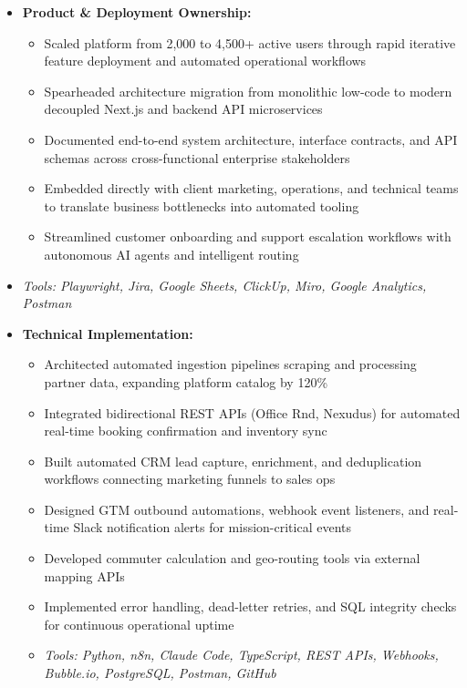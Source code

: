 \documentclass[a4paper,10pt]{article}
\begin{document}
\begin{itemize}
\item \textbf{Product \& Deployment Ownership:}
\begin{itemize}[label=--]
\item Scaled platform from 2,000 to 4,500+ active users through rapid iterative feature deployment and automated operational workflows
\item Spearheaded architecture migration from monolithic low-code to modern decoupled Next.js and backend API microservices
\item Documented end-to-end system architecture, interface contracts, and API schemas across cross-functional enterprise stakeholders
\item Embedded directly with client marketing, operations, and technical teams to translate business bottlenecks into automated tooling
\item Streamlined customer onboarding and support escalation workflows with autonomous AI agents and intelligent routing
\end{itemize}
\item \textit{Tools: Playwright, Jira, Google Sheets, ClickUp, Miro, Google Analytics, Postman}
\item \textbf{Technical Implementation:}
\begin{itemize}[label=--]
\item Architected automated ingestion pipelines scraping and processing partner data, expanding platform catalog by 120\%
\item Integrated bidirectional REST APIs (Office Rnd, Nexudus) for automated real-time booking confirmation and inventory sync
\item Built automated CRM lead capture, enrichment, and deduplication workflows connecting marketing funnels to sales ops
\item Designed GTM outbound automations, webhook event listeners, and real-time Slack notification alerts for mission-critical events
\item Developed commuter calculation and geo-routing tools via external mapping APIs
\item Implemented error handling, dead-letter retries, and SQL integrity checks for continuous operational uptime
\item \textit{Tools: Python, n8n, Claude Code, TypeScript, REST APIs, Webhooks, Bubble.io, PostgreSQL, Postman, GitHub}
\end{itemize}
\end{itemize}
\end{document}
